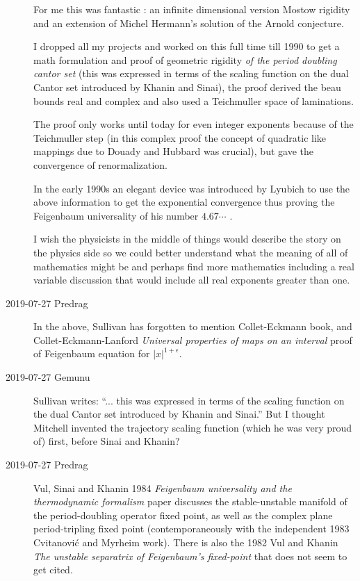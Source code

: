 \begin{description}
For me this was fantastic :
an infinite dimensional version Mostow rigidity and an extension of
Michel Hermann's solution of the Arnold conjecture.

I dropped all my projects and worked on this full time till 1990 to get a
math formulation and proof of geometric  rigidity \emph{of the period
doubling cantor set} (this was expressed in terms of the scaling function
on the dual Cantor set introduced by Khanin and Sinai), the
proof derived the beau bounds real and complex and also used a
Teichmuller space of laminations.

The proof only works until today for even integer exponents because of
the Teichmuller step (in this complex proof the concept of quadratic like
mappings due to Douady and Hubbard was crucial), but gave the convergence
of renormalization.

In the early 1990s an elegant device was introduced by Lyubich to use the
above information to get the exponential convergence thus proving the
Feigenbaum universality of his number $4.67\cdots$ .

I wish the physicists in the middle of things would describe the story on
the physics side so we could better understand what the meaning of all of
mathematics might be and perhaps find more mathematics including a real
variable discussion that would include all real exponents greater than
one.

\item[2019-07-27 Predrag]
In the above, Sullivan has forgotten to mention Collet-Eckmann
book, and Collet-Eckmann-Lanford {\em
Universal properties of maps on an interval} proof of Feigenbaum
equation for $|x|^{1+\epsilon}$.

\item[2019-07-27 Gemunu]
Sullivan writes: ``... this was expressed in terms of the scaling
function on the dual Cantor set introduced by Khanin and Sinai.'' But I
thought Mitchell invented the trajectory scaling function (which he was
very proud of) first, before Sinai and Khanin?

\item[2019-07-27 Predrag]
Vul, Sinai and Khanin 1984 {\em Feigenbaum universality and
the thermodynamic formalism} paper discusses the stable-unstable manifold
of the period-doubling operator fixed point, as well as the complex plane
period-tripling fixed point (contemporaneously with the independent 1983
Cvitanovi{\'c} and Myrheim work). There is also the
1982 Vul and Khanin {\em The unstable separatrix of
{Feigenbaum}'s fixed-point} that does not seem to get cited.


\end{description}
